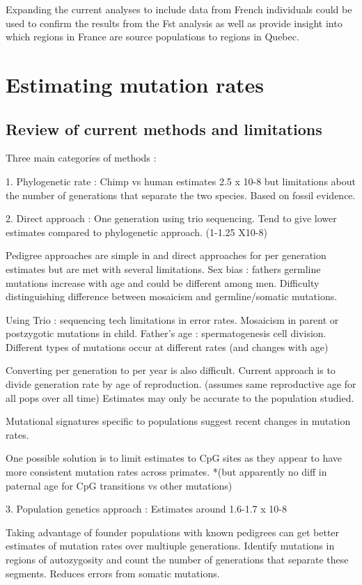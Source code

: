 \documentclass[
11pt, %
oneside, %
english, %
doublespacing, %
headsepline, %
]{MastersDoctoralThesis} %
\begin{document}
Expanding the current analyses to include data from French individuals could be used to confirm the results from the Fst analysis as well as provide insight into which regions in France are source populations to regions in Quebec. 

\chapter{Estimating mutation rates}

\section{Review of current methods and limitations}
Three main categories of methods :

1. Phylogenetic rate : Chimp vs human estimates 2.5 x 10-8 but limitations about the number of generations that separate the two species. Based on fossil evidence.

2. Direct approach : One generation using trio sequencing. 
Tend to give lower estimates compared to phylogenetic approach. (1-1.25 X10-8)

Pedigree approaches are simple in and direct approaches for per generation estimates but are met with several limitations.
Sex bias : fathers germline mutations increase with age and could be different among men.
Difficulty distinguishing difference between mosaicism and germline/somatic mutations.

Using Trio : sequencing tech limitations in error rates.
Mosaicism in parent or postzygotic mutations in child.
Father's age : spermatogenesis cell division.
Different types of mutations occur at different rates (and changes with age)

Converting per generation to per year is also difficult. 
Current approach is to divide generation rate by age of reproduction. (assumes same reproductive age for all pops over all time)
Estimates may only be accurate to the population studied. 

Mutational signatures specific to populations suggest recent changes in mutation rates. 

One possible solution is to limit estimates to CpG sites as they appear to have more consistent mutation rates across primates. *(but apparently no diff in paternal age for CpG transitions vs other mutations)

3. Population genetics approach : 
Estimates around 1.6-1.7 x 10-8

Taking advantage of founder populations with known pedigrees can get better estimates of mutation rates over multiuple generations.
Identify mutations in regions of autozygosity and count the number of generations that separate these segments. 
Reduces errors from somatic mutations. 
\end{document}
